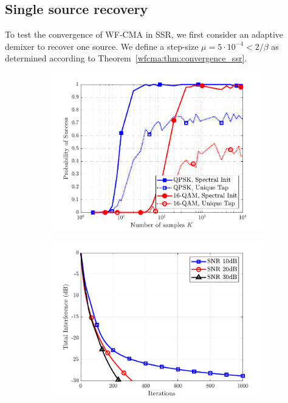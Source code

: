 \subsection{Single source recovery} \label{wfcma:sim:singlesource}
To test the convergence of WF-CMA in SSR, we first consider an adaptive demixer to recover one source.  We define a step-size $\mu=5\cdot10^{-4}<2/\beta$ as determined according to Theorem~\ref{wfcma:thm:convergence_ssr}.

\begin{figure}
\centering
\begin{subfigure}[t]{0.32\textwidth}
	\includegraphics[width=\linewidth]{./figs/wfcma_figs/BF_WF_sucess_allmods_L=4_M=8_T=1000_mu=5e-4.pdf}	
\label{wfcma:fig:wf_ssr_success}
\end{subfigure}\hfill
\begin{subfigure}[t]{0.32\textwidth}
\includegraphics[width=\linewidth]{./figs/wfcma_figs/BF_WF_TI_4QAM_L=4_M=8_K=400_2.pdf}	

\end{subfigure}
\end{figure}

